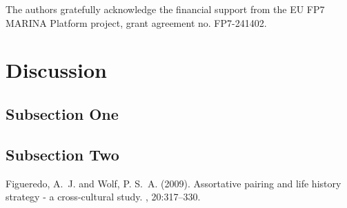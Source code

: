 \documentclass[twocolumn]{article}
\begin{document}
The authors gratefully acknowledge the financial support
from the EU FP7 MARINA Platform project, grant agreement no. FP7-241402.

\section{Discussion}

\subsection{Subsection One}

\lipsum[7] %

\subsection{Subsection Two}

\lipsum[8] %


\begin{thebibliography}{99} %

Figueredo, A.~J. and Wolf, P. S.~A. (2009).
\newblock Assortative pairing and life history strategy - a cross-cultural
  study.
, 20:317--330.
 
\end{thebibliography}


\end{document}
